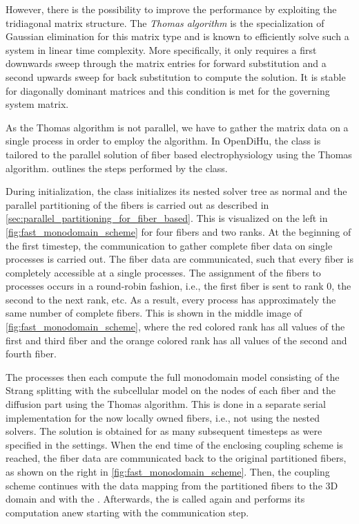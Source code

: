 However, there is the possibility to improve the performance by exploiting the tridiagonal matrix structure. The \emph{Thomas algorithm} is the specialization of Gaussian elimination for this matrix type and is known to efficiently solve such a system in linear time complexity. More specifically, it only requires a first downwards sweep through the matrix entries for forward substitution and a second upwards sweep for back substitution to compute the solution. It is stable for diagonally dominant matrices and this condition is met for the governing system matrix.

As the Thomas algorithm is not parallel, we have to gather the matrix data on a single process in order to employ the algorithm. In OpenDiHu, the  class is tailored to the parallel solution of fiber based electrophysiology using the Thomas algorithm. 
 outlines the steps performed by the  class.

During initialization, the  class initializes its nested solver tree as normal and the parallel partitioning of the fibers is carried out as described in \cref{sec:parallel_partitioning_for_fiber_based}. This is visualized on the left in \cref{fig:fast_monodomain_scheme} for four fibers and two ranks. At the beginning of the first timestep, the communication to gather complete fiber data on single processes is carried out. The fiber data are communicated, such that every fiber is completely accessible at a single processes. The assignment of the fibers to processes occurs in a round-robin fashion, i.e., the first fiber is sent to rank 0, the second to the next rank, etc. As a result, every process has approximately the same number of complete fibers. 
This is shown in the middle image of \cref{fig:fast_monodomain_scheme}, where the red colored rank has all values of the first and third fiber and the orange colored rank has all values of the second and fourth fiber.

The processes then each compute the full monodomain model consisting of the Strang splitting with the subcellular model on the nodes of each fiber and the diffusion part using the Thomas algorithm. 
This is done in a separate serial implementation for the now locally owned fibers, i.e., not using the nested solvers. The solution is obtained for as many subsequent timesteps as were specified in the settings. When the end time of the enclosing coupling scheme is reached, the fiber data are communicated back to the original partitioned fibers, as shown on the right in \cref{fig:fast_monodomain_scheme}.
Then, the coupling scheme continues with the data mapping from the partitioned fibers to the 3D domain and with the . Afterwards, the  is called again and performs its computation anew starting with the communication step.

